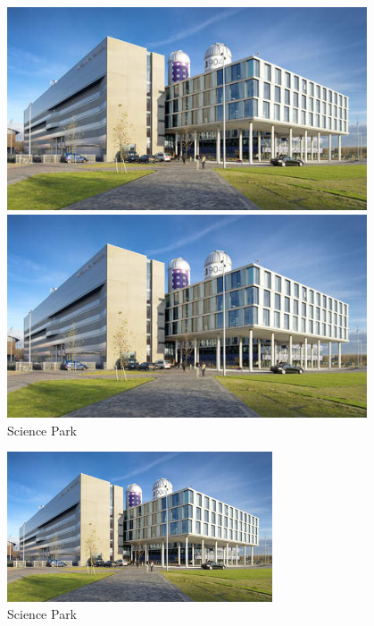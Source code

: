 \begin{figure}[H]
    \begin{minipage}[p]{0.48\textwidth}
        \centering
        \includegraphics[width=0.95\textwidth]{SciencePark.jpg}
    \end{minipage}
    \begin{minipage}[p]{0.48\textwidth}
        \centering
        \includegraphics[width=0.95\textwidth]{SciencePark.jpg}
    \end{minipage}
    \caption{Science Park}
\end{figure}

\begin{figure}[H]
    \centering
        \includegraphics[width=0.7\textwidth]{SciencePark.jpg}
        \caption{Science Park}
        \centering
\end{figure}


